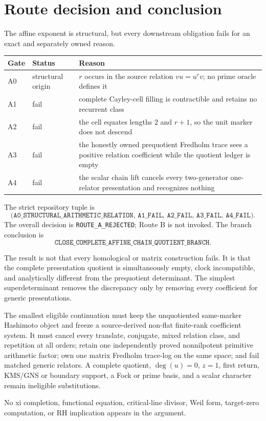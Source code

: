 \section{Route decision and conclusion}
\label{sec:conclusion}

The affine exponent is structural, but every downstream obligation fails for
an exact and separately owned reason.

\begin{table}[htbp]
\centering
\small
\begin{tabularx}{\textwidth}{@{}L{0.14\textwidth}L{0.19\textwidth}Y@{}}
\toprule
Gate & Status & Reason \\
\midrule
A0 & structural origin & $r$ occurs in the source relation $vu=u^rv$; no prime oracle defines it \\
A1 & fail & complete Cayley-cell filling is contractible and retains no recurrent class \\
A2 & fail & the cell equates lengths $2$ and $r+1$, so the unit marker does not descend \\
A3 & fail & the honestly owned prequotient Fredholm trace sees a positive relation coefficient while the quotient ledger is empty \\
A4 & fail & the scalar chain lift cancels every two-generator one-relator presentation and recognizes nothing \\
\bottomrule
\end{tabularx}
\end{table}

The strict repository tuple is
\[
\texttt{(A0\_STRUCTURAL\_ARITHMETIC\_RELATION, A1\_FAIL,
A2\_FAIL, A3\_FAIL, A4\_FAIL)}.
\]
The overall decision is \texttt{ROUTE\_A\_REJECTED}; Route B is not invoked.
The branch conclusion is
\[
\boxed{\texttt{CLOSE\_COMPLETE\_AFFINE\_CHAIN\_QUOTIENT\_BRANCH}.}
\]

The result is not that every homological or matrix construction fails.  It is
that the complete presentation quotient is simultaneously empty, clock
incompatible, and analytically different from the prequotient determinant.
The simplest superdeterminant removes the discrepancy only by removing every
coefficient for generic presentations.

The smallest eligible continuation must keep the unquotiented same-marker
Hashimoto object and freeze a source-derived non-flat finite-rank coefficient
system.  It must cancel every translate, conjugate, mixed relation class, and
repetition at all orders; retain one independently proved nonnilpotent
primitive arithmetic factor; own one matrix Fredholm trace-log on the same
space; and fail matched generic relators.  A complete quotient, $\deg(u)=0$,
$z=1$, first return, KMS/GNS or boundary support, a Fock or prime basis, and a
scalar character remain ineligible substitutions.

No xi completion, functional equation, critical-line divisor, Weil form,
target-zero computation, or RH implication appears in the argument.
